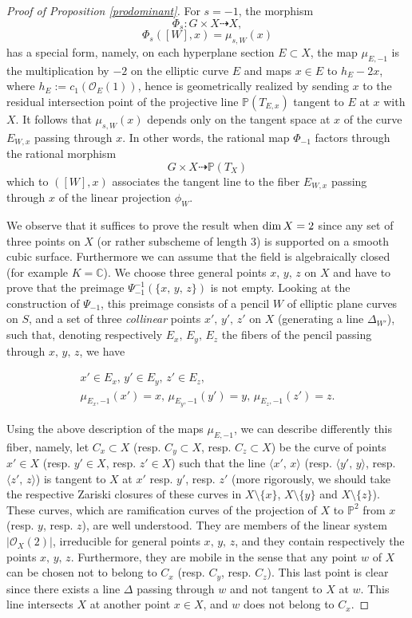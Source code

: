 \documentclass[10pt]{article}
\begin{document}
\begin{proof}[Proof of Proposition \ref{prodominant}] For $s=-1$, the morphism
$$\Phi_s: G\times X\dashrightarrow X,$$
$$\Phi_s([W],x)=\mu_{s,W}(x)$$
has a special form, namely,  on each hyperplane section $E\subset X$, the map $\mu_{E,-1}$ is the multiplication by $-2$ on the elliptic curve $E$ and  maps $x\in E$ to
$h_E-2x$, where $h_E:=c_1(\mathcal{O}_E(1))$, hence is geometrically realized by sending $x$ to the residual intersection point of the projective  line
$\mathbb{P}(T_{E,x})$ tangent to $E$ at $x$ with $X$. It follows that $\mu_{s,W}(x)$ depends only on the tangent space at $x$ of the curve $E_{W,x}$ passing through $x$. In other words, the rational map $\Phi_{-1}$ factors
  through the rational morphism
$$ G\times X\dashrightarrow\mathbb{P}(T_X)$$
which to $([W], x)$ associates the tangent line to the fiber $E_{W,x}$ passing through $x$  of the linear projection $\phi_W$.

We observe that it suffices to prove the result when  ${\rm dim}\,X=2$ since any set of three points on $X$ (or rather subscheme of length $3$) is supported on a smooth cubic surface.
Furthermore we can assume that the field is algebraically closed (for example $K=\mathbb{C}$). We choose three  general points $x,\,y,\,z$ on $X$ and have to prove that the preimage
$\Psi_{-1}^{-1}(\{x,\,y,\,z\})$ is not empty.
Looking at the construction of $\Psi_{-1}$, this preimage consists of a pencil $W$ of elliptic plane curves on $S$, and a set of three {\it collinear} points $x',\,y',\,z'$ on $X$ (generating a line $\Delta_{W'}$), such that, denoting respectively
$E_x,\,E_y,\,E_z$ the fibers of the pencil passing through $x,\,y,\,z$, we have

\begin{eqnarray}\label{eqpointcourbe} x'\in E_x,\,y'\in E_y,\,z'\in E_z,\\
\label{eqpointmultmoinsun}\mu_{E_x,-1}(x')=x,\, \mu_{E_y,-1}(y')=y,\,\mu_{E_z,-1}(z')=z.\end{eqnarray}


Using the above description of the maps $\mu_{E,-1}$, we can describe differently this fiber, namely, let
$C_x\subset X$ (resp. $C_y\subset X$, resp. $C_z\subset X$) be the curve of points $x'\in X$ (resp. $y'\in X$, resp. $z'\in X$)  such that the line
$\langle x',\,x\rangle$ (resp. $\langle y',\,y\rangle$, resp. $\langle z',\,z\rangle$) is tangent to $X$ at $x'$  resp. $y'$, resp. $z'$ (more rigorously, we should take the respective Zariski closures of these curves in $X\setminus \{x\}$,  $X\setminus \{y\}$ and $X\setminus \{z\}$). These curves, which are ramification curves of the projection of $X$ to $\mathbb{P}^2$  from $x$ (resp. $y$, resp. $z$), are well understood. They are members of the linear system  $|\mathcal{O}_X(2)|$, irreducible for general points $x,\,y,\,z$, and they contain respectively the points $x,\,y,\,z$. Furthermore, they are mobile in the sense that  any point $w$ of $X$ can be chosen not to belong to $C_x$ (resp. $C_y$, resp. $C_z$). This last point is clear since there exists a line $\Delta$ passing through $w$ and not tangent to $X$ at $w$. This line intersects $X$ at another point $x\in X$, and $w$ does not belong to $C_x$.


\end{proof}
\end{document}
